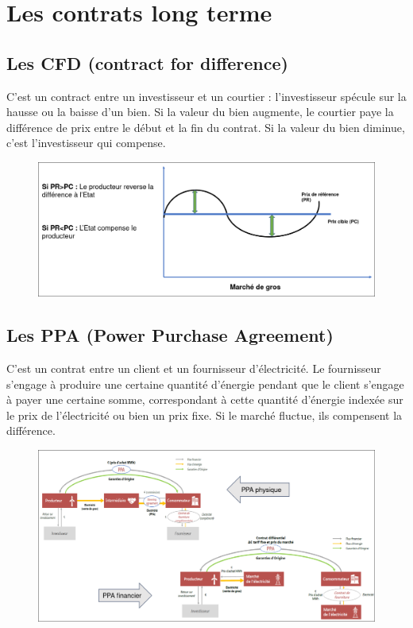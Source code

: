 \section{Les contrats long terme}
\subsection{Les CFD (contract for difference)}   
C'est un contract entre un investisseur et un courtier : l'investisseur spécule sur la hausse ou la baisse d'un bien. Si la valeur du bien augmente, le courtier paye la différence de prix entre le début et la fin du contrat. Si la valeur du bien diminue, c'est l'investisseur qui compense.
\begin{figure}[hbt!]
    \centering
    \includegraphics[scale=0.3531]{Pics/CFD_fonctionnement.png}
\end{figure}
\subsection{Les PPA (Power Purchase Agreement)}
C'est un contrat entre un client et un fournisseur d'électricité. Le fournisseur s'engage à produire une certaine quantité d'énergie pendant que le client s'engage à payer une certaine somme, correspondant à cette quantité d'énergie indexée sur le prix de l'électricité ou bien un prix fixe. Si le marché fluctue, ils compensent la différence.
\newpage
\begin{figure}[hbt!]
    \centering
    \includegraphics[scale=0.3531]{Pics/PPA_physique_et_PPA_financier.png}
\end{figure}
